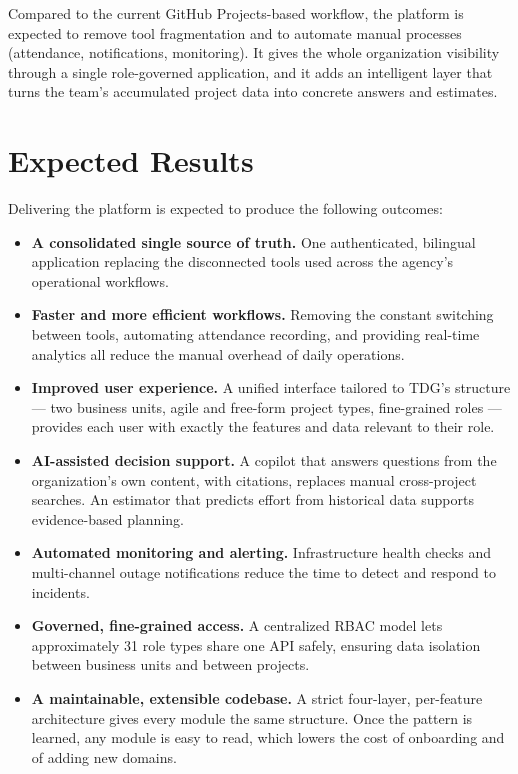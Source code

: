 Compared to the current GitHub Projects-based workflow, the platform is expected to remove
tool fragmentation and to automate manual processes (attendance, notifications, monitoring).
It gives the whole organization visibility through a single role-governed application, and it
adds an intelligent layer that turns the team's accumulated project data into concrete answers
and estimates.

\section{Expected Results}

Delivering the platform is expected to produce the following outcomes:

\begin{itemize}
  \item \textbf{A consolidated single source of truth.} One authenticated, bilingual application
    replacing the disconnected tools used across the agency's operational workflows.
  \item \textbf{Faster and more efficient workflows.} Removing the constant switching between
    tools, automating attendance recording, and providing real-time analytics all reduce the
    manual overhead of daily operations.
  \item \textbf{Improved user experience.} A unified interface tailored to TDG's structure ---
    two business units, agile and free-form project types, fine-grained roles --- provides each
    user with exactly the features and data relevant to their role.
  \item \textbf{AI-assisted decision support.} A copilot that answers questions from the
    organization's own content, with citations, replaces manual cross-project searches. An
    estimator that predicts effort from historical data supports evidence-based planning.
  \item \textbf{Automated monitoring and alerting.} Infrastructure health checks and multi-channel
    outage notifications reduce the time to detect and respond to incidents.
  \item \textbf{Governed, fine-grained access.} A centralized RBAC model lets approximately 31
    role types share one API safely, ensuring data isolation between business units and between
    projects.
  \item \textbf{A maintainable, extensible codebase.} A strict four-layer, per-feature
    architecture gives every module the same structure. Once the pattern is learned, any module
    is easy to read, which lowers the cost of onboarding and of adding new domains.
\end{itemize}

